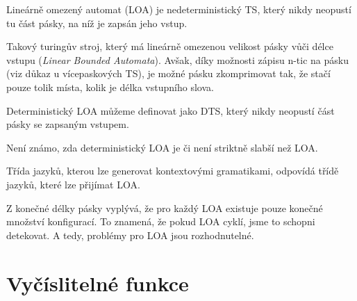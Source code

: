 \begin{compactitem}
    \item Lineárně omezený automat (LOA) je nedeterministický TS, který nikdy neopustí tu část pásky, na níž je zapsán jeho vstup. \begin{compactitem}
        \item Takový turingův stroj, který má lineárně omezenou velikost pásky vůči délce vstupu (\textit{Linear Bounded Automata}). Avšak, díky možnosti zápisu n-tic na pásku (viz důkaz u vícepaskových TS), je možné pásku zkomprimovat tak, že stačí pouze tolik místa, kolik je délka vstupního slova.
    \end{compactitem}

    \item Deterministický LOA můžeme definovat jako DTS, který nikdy neopustí část pásky se zapsaným vstupem. \begin{compactitem}
        \item Není známo, zda deterministický LOA je či není striktně slabší než LOA.
    \end{compactitem}

    \item Třída jazyků, kterou lze generovat kontextovými gramatikami, odpovídá třídě jazyků, které lze přijímat LOA.

    \item Z konečné délky pásky vyplývá, že pro každý LOA existuje pouze konečné množství konfigurací. To znamená, že pokud LOA cyklí, jsme to schopni detekovat. A tedy, problémy pro LOA jsou rozhodnutelné.
\end{compactitem}



\section{Vyčíslitelné funkce}

